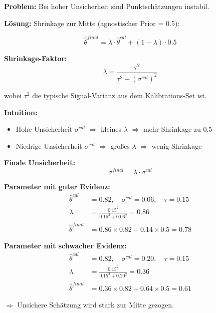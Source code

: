 \begin{tcolorbox}[colback=gray!5!white, colframe=gray!75!black,
    title=\textbf{Axiom CAL-4: Evidenz-gewichteter Shrinkage}]

\textbf{Problem:} Bei hoher Unsicherheit sind Punktschätzungen instabil.

\textbf{Lösung:} Shrinkage zur Mitte (agnostischer Prior = 0.5):

\begin{equation}
\boxed{\hat{\theta}^{final} = \lambda \cdot \hat{\theta}^{cal} + (1 - \lambda) \cdot 0.5}
\end{equation}

\textbf{Shrinkage-Faktor:}
\begin{equation}
\lambda = \frac{\tau^2}{\tau^2 + (\sigma^{cal})^2}
\end{equation}

wobei $\tau^2$ die typische Signal-Varianz aus dem Kalibrations-Set ist.

\textbf{Intuition:}
\begin{itemize}[nosep]
    \item Hohe Unsicherheit $\sigma^{cal}$ $\Rightarrow$ kleines $\lambda$ $\Rightarrow$ mehr Shrinkage zu 0.5
    \item Niedrige Unsicherheit $\sigma^{cal}$ $\Rightarrow$ großes $\lambda$ $\Rightarrow$ wenig Shrinkage
\end{itemize}

\textbf{Finale Unsicherheit:}
\begin{equation}
\sigma^{final} = \lambda \cdot \sigma^{cal}
\end{equation}

\end{tcolorbox}

\begin{tcolorbox}[colback=yellow!5!white, colframe=yellow!75!black,
    title=\textbf{Beispiel: Shrinkage in Aktion}]

\textbf{Parameter mit guter Evidenz:}
\begin{align*}
\hat{\theta}^{cal} &= 0.82, \quad \sigma^{cal} = 0.06, \quad \tau = 0.15 \\
\lambda &= \frac{0.15^2}{0.15^2 + 0.06^2} = 0.86 \\
\hat{\theta}^{final} &= 0.86 \times 0.82 + 0.14 \times 0.5 = \mathbf{0.78}
\end{align*}

\textbf{Parameter mit schwacher Evidenz:}
\begin{align*}
\hat{\theta}^{cal} &= 0.82, \quad \sigma^{cal} = 0.20, \quad \tau = 0.15 \\
\lambda &= \frac{0.15^2}{0.15^2 + 0.20^2} = 0.36 \\
\hat{\theta}^{final} &= 0.36 \times 0.82 + 0.64 \times 0.5 = \mathbf{0.61}
\end{align*}

$\Rightarrow$ Unsichere Schätzung wird stark zur Mitte gezogen.

\end{tcolorbox}


